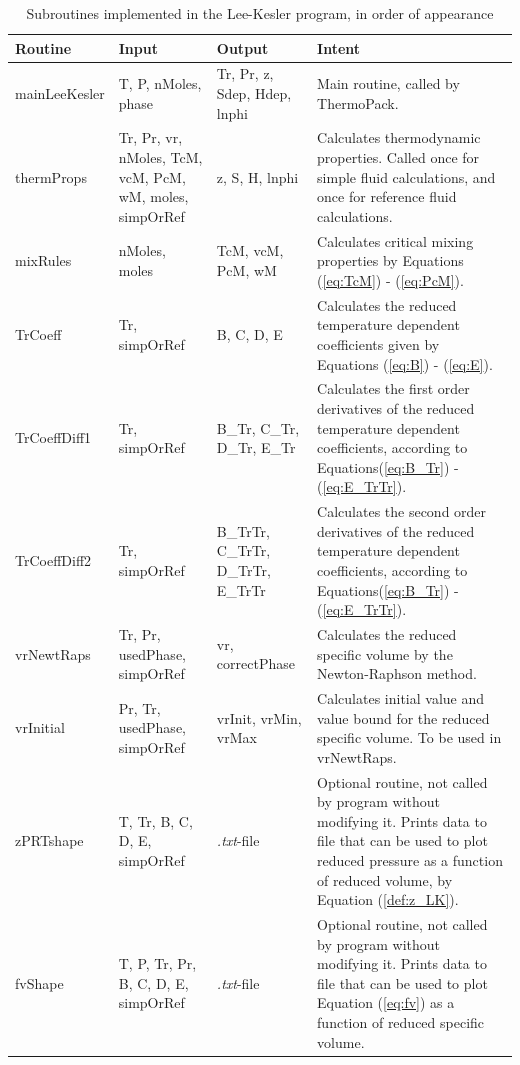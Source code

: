 \documentclass[english]{../thermomemo/thermomemo}
\numberwithin{equation}{section}
\newcommand*{\reff}[1]{(\ref{#1})}
\begin{document}
\renewcommand{\arraystretch}{1.2}
\begin{table}[h]
\begin{center}
\caption{Subroutines implemented in the Lee-Kesler program, in order of appearance}
\label{tab:subroutines}
\begin{tabular}{l p{3cm} p{3cm} p{6cm}}
\hline%
Routine & Input & Output  & Intent\\
\hline
mainLeeKesler	& T, P, nMoles, phase & Tr, Pr, z, Sdep, Hdep, lnphi & Main routine, called by ThermoPack. \\
thermProps		& Tr, Pr, vr, nMoles, TcM, vcM, PcM, wM, moles, simpOrRef & z, S, H, lnphi & Calculates thermodynamic properties. Called once for simple fluid calculations, and once for reference fluid calculations. \\
mixRules		& nMoles, moles & TcM, vcM, PcM, wM & Calculates critical mixing properties by Equations \reff{eq:TcM} - \reff{eq:PcM}.	\\
TrCoeff			& Tr, simpOrRef	& B, C, D, E & Calculates the reduced temperature dependent coefficients given by Equations \reff{eq:B} - \reff{eq:E}. \\
TrCoeffDiff1 	& Tr, simpOrRef	& B\_Tr, C\_Tr, D\_Tr, E\_Tr	& Calculates the first order derivatives of the reduced temperature dependent coefficients, according to Equations\reff{eq:B_Tr} - \reff{eq:E_TrTr}. \\
TrCoeffDiff2 	& Tr, simpOrRef	& B\_TrTr, C\_TrTr, D\_TrTr, E\_TrTr	& Calculates the second order derivatives of the reduced temperature dependent coefficients, according to Equations\reff{eq:B_Tr} - \reff{eq:E_TrTr}. \\
vrNewtRaps		& Tr, Pr, usedPhase, simpOrRef	& vr, correctPhase	& Calculates the reduced specific volume by the Newton-Raphson method. \\
vrInitial		&	Pr, Tr, usedPhase, simpOrRef	& vrInit, vrMin, vrMax	& Calculates initial value and value bound for the reduced specific volume. To be used in vrNewtRaps. \\
zPRTshape		& T, Tr, B, C, D, E, simpOrRef & \textit{.txt}-file	& Optional routine, not called by program without modifying it. Prints data to file that can be used to plot reduced pressure as a function of reduced volume, by Equation \reff{def:z_LK}. \\
fvShape			& T, P, Tr, Pr, B, C, D, E, simpOrRef & \textit{.txt}-file & Optional routine, not called by program without modifying it. Prints data to file that can be used to plot Equation \reff{eq:fv} as a function of reduced specific volume. \\
\hline
\end{tabular}
\end{center}
\end{table}
\end{document}
